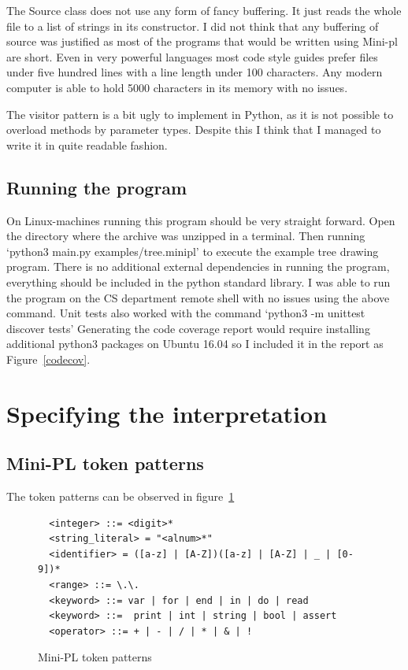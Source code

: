 \documentclass[12pt,a4paper]{article}
\begin{document}
The Source class does not use any form of fancy buffering. It just reads
the whole file to a list of strings in its constructor. I did not think
that any buffering of source was justified as most of the programs 
that would be written using Mini-pl are short. Even in very powerful
languages most code style guides prefer files under five hundred lines with
a line length under 100 characters. Any modern computer is able to hold
5000 characters in its memory with no issues.

The visitor pattern is a bit ugly to implement in Python,
as it is not possible to overload methods by parameter types.
Despite this I think that I managed to write it in quite
readable fashion.

\subsection{Running the program}

On Linux-machines running this program should be very straight forward.
Open the directory where the archive was unzipped in a terminal.
Then running 
`python3 main.py  examples/tree.minipl'
to execute the example tree drawing program.
There is no additional external dependencies in running the program,
everything should be included in the python standard library.
I was able to run the program on the CS department remote shell
with no issues using the above command. Unit tests also worked
with the command `python3 -m unittest discover tests'
Generating the code coverage report would require installing 
additional python3 packages on Ubuntu 16.04 so I included it in the 
report as Figure~\ref{codecov}.


\section{Specifying the interpretation}

\subsection{Mini-PL token patterns}
The token patterns can be observed in figure~\ref{token_patterns}
\begin{figure}\label{token_patterns}
  \caption{Mini-PL token patterns}
  \begin{verbatim}
  <integer> ::= <digit>*
  <string_literal> = "<alnum>*"
  <identifier> = ([a-z] | [A-Z])([a-z] | [A-Z] | _ | [0-9])*
  <range> ::= \.\.
  <keyword> ::= var | for | end | in | do | read 
  <keyword> ::=  print | int | string | bool | assert
  <operator> ::= + | - | / | * | & | !
  \end{verbatim}
\end{figure}
\end{document}
